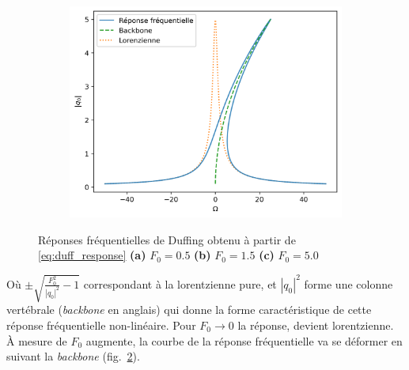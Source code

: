 \begin{figure}[t]
\begin{subfigure}[b]{0.31\textwidth}
        \includegraphics[width=\textwidth]{images/duffing/notitle_F0=5.0.png}
        \caption{}\label{fig:duffing_response_3}
    \end{subfigure} 
    \caption{Réponses fréquentielles de Duffing obtenu à partir de \eqref{eq:duff_response} \textbf{(a)} $F_0=0.5$ \textbf{(b)} $F_0=1.5$ \textbf{(c)} $F_0=5.0$}\label{fig:duffing_response_all}
\end{figure}
Où $\pm \sqrt{\frac{F_0^2}{|q_0|^2} - 1 }$ correspondant à la lorentzienne pure, et $|q_0|^2$ forme 
une colonne vertébrale (\emph{backbone} en anglais) qui donne la forme caractéristique de cette réponse fréquentielle non-linéaire.
%
Pour $F_0 \to 0$ la réponse, devient lorentzienne. À mesure de $F_0$ augmente, la courbe de la réponse fréquentielle va 
se déformer en suivant la \emph{backbone} (fig.~\ref{fig:duffing_response_all}).

